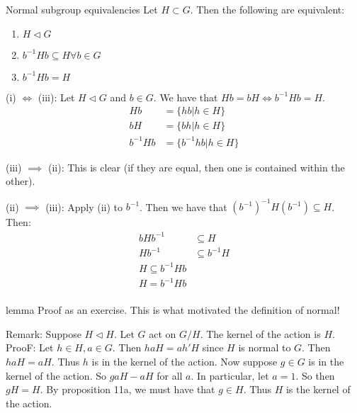 \documentclass{article}
\begin{document}
\begin{cprop}{Normal subgroup equivalencies}{}
    Let $H \subset G$. Then the following are equivalent:
    \begin{enumerate}
        \item $H \triangleleft G$
        \item $b^{-1} Hb \subseteq H \forall b \in G$
        \item $b^{-1}Hb = H$ 
    \end{enumerate}

    \begin{cpf}
        (i) $\iff$ (iii): Let $H \triangleleft G$ and $b \in G$. We have that $Hb = bH  \iff b^{-1}Hb = H$. 
        \begin{align*}
           Hb & = \{ hb | h \in H \} \\
           bH & = \{ bh | h \in H \}\\
           b^{-1}Hb &= \{ b^{-1}hb | h \in H \}
        \end{align*}

        (iii) $\implies$ (ii): This is clear (if they are equal, then one is contained within the other). 

        (ii) $\implies$ (iii): Apply (ii) to $b^{-1}$. Then we have that $\left( b^{-1} \right)^{-1} H \left( b^{-1} \right) \subseteq H$. Then:
        \begin{align*}
            bHb^{-1} & \subseteq H\\
            Hb^{-1} & \subseteq b^{-1}H\\
            H \subseteq b^{-1}Hb\\
            H = b^{-1}Hb\\
        \end{align*}
        
    \end{cpf}
\end{cprop}

\begin{cprop}{lemma}{}
    Proof as an exercise. This is what motivated the definition of normal!
\end{cprop}

Remark: Suppose $H \triangleleft H$. Let $G$ act on $G/H$. The kernel of the action is $H$. ProoF: Let $h\in H, a \in G$. Then $haH = ah'H$ since $H$ is normal to $G$. Then $haH = aH$. Thus $h$ is in the kernel of the action. Now suppose $g \in G$ is in the kernel of the action. So $gaH - aH$ for all $a$. In particular, let $a = 1$. So then $gH = H$. By proposition 11a, we must have that $g \in H$. Thus $H$ is the kernel of the action.
\end{document}
